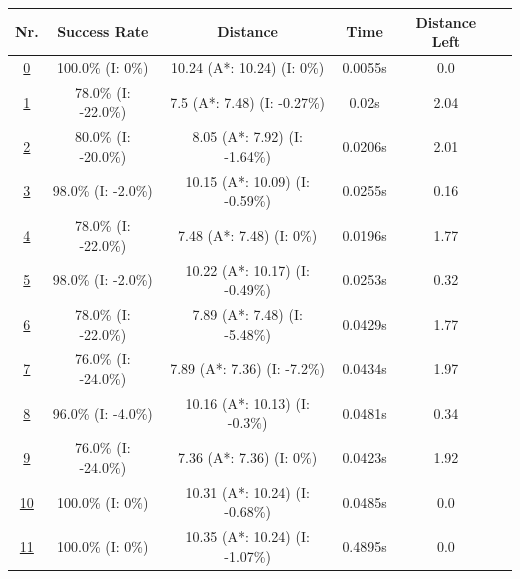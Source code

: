 \begin{table}[h!] 
\footnotesize
\centering


\begin{tabular}{|cc|c|c|c|c|c|}
\hline
\multicolumn{2}{|c|}{\textbf{Nr.}} & \textbf{Success Rate} & \textbf{Distance} & \textbf{Time} & \textbf{Distance Left}\\
\hline
\hline
\multicolumn{2}{|c|}{\cellcolor{lightgray!20} \hyperref[tab: evalalgorithms]{0}} & 100.0\% (I: 0\%) & 10.24 (A*: 10.24) (I: 0\%) & 0.0055s & 0.0\\
\hline
\hline
\multicolumn{2}{|c|}{\cellcolor{red!40} \hyperref[tab: evalalgorithms]{1}} & 78.0\% (I: -22.0\%) & 7.5 (A*: 7.48) (I: -0.27\%) & 0.02s & 2.04\\
\hline
\multicolumn{2}{|c|}{\cellcolor{red!20} \hyperref[tab: evalalgorithms]{2}} & 80.0\% (I: -20.0\%) & 8.05 (A*: 7.92) (I: -1.64\%) & 0.0206s & 2.01\\
\hline
\multicolumn{2}{|c|}{\cellcolor{red!20} \hyperref[tab: evalalgorithms]{3}} & 98.0\% (I: -2.0\%) & 10.15 (A*: 10.09) (I: -0.59\%) & 0.0255s & 0.16\\
\hline
\multicolumn{2}{|c|}{\cellcolor{red!20} \hyperref[tab: evalalgorithms]{4}} & 78.0\% (I: -22.0\%) & 7.48 (A*: 7.48) (I: 0\%) & 0.0196s & 1.77\\
\hline
\multicolumn{2}{|c|}{\cellcolor{red!20} \hyperref[tab: evalalgorithms]{5}} & 98.0\% (I: -2.0\%) & 10.22 (A*: 10.17) (I: -0.49\%) & 0.0253s & 0.32\\
\hline
\hline
\multicolumn{2}{|c|}{\cellcolor{blue!20} \hyperref[tab: evalalgorithms]{6}} & 78.0\% (I: -22.0\%) & 7.89 (A*: 7.48) (I: -5.48\%) & 0.0429s & 1.77\\
\hline
\multicolumn{2}{|c|}{\cellcolor{blue!40} \hyperref[tab: evalalgorithms]{7}} & 76.0\% (I: -24.0\%) & 7.89 (A*: 7.36) (I: -7.2\%) & 0.0434s & 1.97\\
\hline
\multicolumn{2}{|c|}{\cellcolor{blue!20} \hyperref[tab: evalalgorithms]{8}} & 96.0\% (I: -4.0\%) & 10.16 (A*: 10.13) (I: -0.3\%) & 0.0481s & 0.34\\
\hline
\multicolumn{2}{|c|}{\cellcolor{blue!20} \hyperref[tab: evalalgorithms]{9}} & 76.0\% (I: -24.0\%) & 7.36 (A*: 7.36) (I: 0\%) & 0.0423s & 1.92\\
\hline
\multicolumn{2}{|c|}{\cellcolor{blue!20} \hyperref[tab: evalalgorithms]{10}} & 100.0\% (I: 0\%) & 10.31 (A*: 10.24) (I: -0.68\%) & 0.0485s & 0.0\\
\hline
\hline
\multicolumn{2}{|c|}{\cellcolor{orange!40} \hyperref[tab: evalalgorithms]{11}} & 100.0\% (I: 0\%) & 10.35 (A*: 10.24) (I: -1.07\%) & 0.4895s & 0.0\\

\end{tabular}
\end{table}
